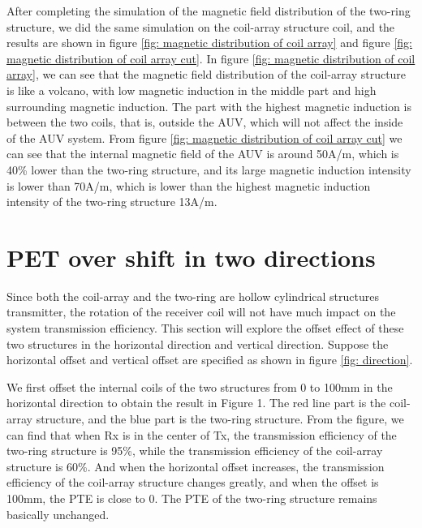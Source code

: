 After completing the simulation of the magnetic field distribution of the two-ring structure, we did the same simulation on the coil-array structure coil, and the results are shown in figure \ref{fig: magnetic distribution of coil array} and figure \ref{fig: magnetic distribution of coil array cut}.
In figure \ref{fig: magnetic distribution of coil array}, we can see that the magnetic field distribution of the coil-array structure is like a volcano, with low magnetic induction in the middle part and high surrounding magnetic induction. The part with the highest magnetic induction is between the two coils, that is, outside the AUV, which will not affect the inside of the AUV system. From figure \ref{fig: magnetic distribution of coil array cut} we can see that the internal magnetic field of the AUV is around 50A/m, which is 40\% lower than the two-ring structure, and its large magnetic induction intensity is lower than 70A/m, which is lower than the highest magnetic induction intensity of the two-ring structure 13A/m.


\section{PET over shift in two directions}

Since both the coil-array and the two-ring are hollow cylindrical structures transmitter, the rotation of the receiver coil will not have much impact on the system transmission efficiency. This section will explore the offset effect of these two structures in the horizontal direction and vertical direction.
Suppose the horizontal offset and vertical offset are specified as shown in figure \ref{fig: direction}.

We first offset the internal coils of the two structures from 0 to 100mm in the horizontal direction to obtain the result in Figure 1. The red line part is the coil-array structure, and the blue part is the two-ring structure. From the figure, we can find that when Rx is in the center of Tx, the transmission efficiency of the two-ring structure is 95\%, while the transmission efficiency of the coil-array structure is 60\%. And when the horizontal offset increases, the transmission efficiency of the coil-array structure changes greatly, and when the offset is 100mm, the PTE is close to 0. The PTE of the two-ring structure remains basically unchanged.

